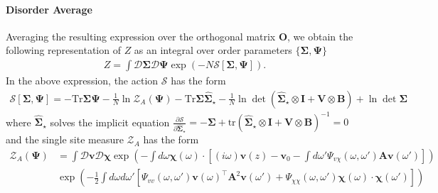 \documentclass{article} %
\def\v{\bm v}
\begin{document}
\paragraph{Disorder Average} Averaging the resulting expression over the orthogonal matrix $\bm O$, we obtain the following representation of $Z$ as an integral over order parameters $\{ \bm\Sigma, \bm\Psi \}$
\begin{align}
    Z = \int \mathcal D\bm\Sigma \mathcal D \bm\Psi \exp\left( - N \mathcal S[\bm\Sigma,\bm\Psi] \right).
\end{align}
In the above expression, the action $\mathcal S$ has the form 
\begin{align}
    \mathcal S[\bm\Sigma,\bm\Psi] = -  \text{Tr}   \bm\Sigma \bm\Psi  - \frac{1}{N} \ln \mathcal Z_A(\bm\Psi) - \text{Tr} \bm\Sigma  \hat{\bm\Sigma}_\star  - \frac{1}{N}\ln\det\left( \hat{\bm\Sigma}_\star \otimes \bm I + \bm V \otimes \bm B \right) + \ln\det \bm\Sigma
\end{align}
where $\hat{\bm\Sigma}_\star$ solves the implicit equation $\frac{\partial \mathcal S}{\partial \hat{\bm\Sigma}_\star} = -\bm\Sigma + \text{tr}\left(  \bm{\hat\Sigma}_\star \otimes \bm I + \bm V \otimes \bm B \right)^{-1} = 0$ and the single site measure $\mathcal Z_A$ has the form
\begin{align}
    \mathcal Z_A(\bm\Psi)& = \int \mathcal D\v\mathcal D\bm\chi
    \exp\left(  - \int d\omega \bm\chi(\omega) \cdot \left[ (i\omega) \v(z) - \v_0 - \int d\omega' \Psi_{v \chi}(\omega,\omega') \bm A \v(\omega') \right] \right) \nonumber
    \\
    &\exp\left( - \frac{1}{2} \int d \omega d\omega' \left[\Psi_{vv}( \omega,\omega' ) \v(\omega)^\top \bm A^2 \v(\omega') + \Psi_{\chi\chi}(\omega,\omega') \bm\chi(\omega) \cdot \bm\chi(\omega')   \right]    \right)
\end{align}
\end{document}
